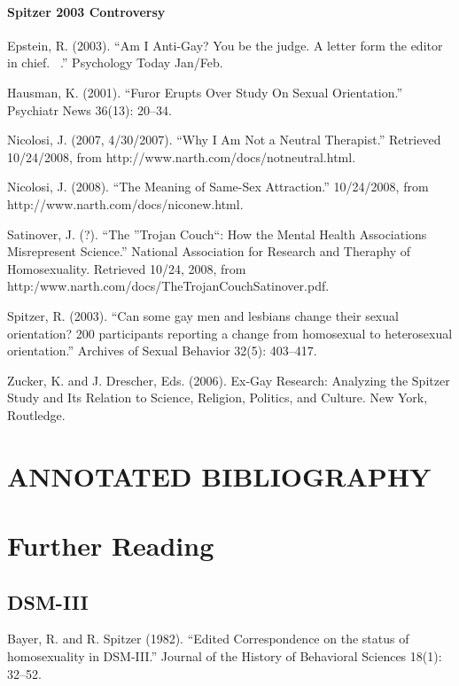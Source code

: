 \subsubsection{Spitzer 2003 Controversy}
\label{spitzer2003controversy}

Epstein, R. (2003). ``Am I Anti-Gay? You be the judge. A letter form the editor in chief.  .'' Psychology Today Jan\slash Feb.

Hausman, K. (2001). ``Furor Erupts Over Study On Sexual Orientation.'' Psychiatr News 36(13): 20--34.

Nicolosi, J. (2007, 4\slash 30\slash 2007). ``Why I Am Not a Neutral Therapist.'' Retrieved 10\slash 24\slash 2008, from http:\slash \slash www.narth.com\slash docs\slash notneutral.html.

Nicolosi, J. (2008). ``The Meaning of Same-Sex Attraction.'' 10\slash 24\slash 2008, from http:\slash \slash www.narth.com\slash docs\slash niconew.html.

Satinover, J. (?). ``The ''Trojan Couch``: How the Mental Health Associations Misrepresent Science.'' National Association for Research and Theraphy of Homosexuality. Retrieved 10\slash 24, 2008, from http:\slash www.narth.com\slash docs\slash TheTrojanCouchSatinover.pdf.

Spitzer, R. (2003). ``Can some gay men and lesbians change their sexual orientation? 200 participants reporting a change from homosexual to heterosexual orientation.'' Archives of Sexual Behavior 32(5): 403--417.

Zucker, K. and J. Drescher, Eds. (2006). Ex-Gay Research: Analyzing the Spitzer Study and Its Relation to Science, Religion, Politics, and Culture. New York, Routledge.

\pagebreak 

\chapter{ANNOTATED BIBLIOGRAPHY}
\label{annotatedbibliography}

\chapter{Further Reading}
\label{furtherreading}

\section{DSM-III}
\label{dsm-iii}

Bayer, R. and R. Spitzer (1982). ``Edited Correspondence on the status of homosexuality in DSM-III.'' Journal of the History of Behavioral Sciences 18(1): 32--52.

